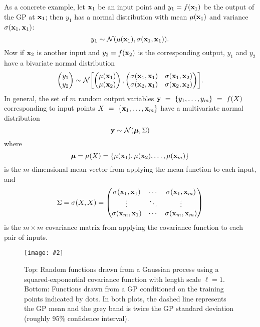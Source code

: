 \documentclass[aps,prc,reprint,superscriptaddress,amsmath]{revtex4-1}
\newcommand{\colfig}[3][t]{
  \begin{figure}[#1]
    \texttt{[image: \#2]}
    \caption{\label{fig:#2}#3}
  \end{figure}
}
\begin{document}
As a concrete example, let $\mathbf x_1$ be an input point and $y_1 = f(\mathbf x_1)$ be the output of the GP at $\mathbf x_1$; then $y_1$ has a normal distribution with mean $\mu(\mathbf x_1)$ and variance $\sigma(\mathbf x_1, \mathbf x_1)$:
\begin{equation}
  y_1 \sim \mathcal N(\mu(\mathbf x_1), \sigma(\mathbf x_1, \mathbf x_1)).
\end{equation}
Now if $\mathbf x_2$ is another input and $y_2 = f(\mathbf x_2)$ is the corresponding output, $y_1$ and $y_2$ have a bivariate normal distribution
\begin{equation}
  \begin{pmatrix}
    y_1 \\ y_2
  \end{pmatrix}
  \sim \mathcal N\biggl[
    \begin{pmatrix}
      \mu(\mathbf x_1) \\ \mu(\mathbf x_2)
    \end{pmatrix},
    \begin{pmatrix}
      \sigma(\mathbf x_1, \mathbf x_1) & \sigma(\mathbf x_1, \mathbf x_2) \\
      \sigma(\mathbf x_2, \mathbf x_1) & \sigma(\mathbf x_2, \mathbf x_2) \\
    \end{pmatrix}
  \biggr].
\end{equation}
In general, the set of $m$ random output variables $\mathbf y~=~\{y_1, \ldots, y_m\}~=~f(X)$ corresponding to input points $X~=~\{\mathbf x_1, \ldots, \mathbf x_m\}$ have a multivariate normal distribution
\begin{equation}
  \mathbf y \sim \mathcal N(\boldsymbol\mu, \Sigma)
\end{equation}
where
\begin{equation}
  \boldsymbol\mu = \mu(X) = \{\mu(\mathbf x_1), \mu(\mathbf x_2), \ldots, \mu(\mathbf x_m)\} \\
\end{equation}
is the $m$-dimensional mean vector from applying the mean function to each input, and
\begin{equation}
  \Sigma = \sigma(X, X) =
  \begin{pmatrix}
    \sigma(\mathbf x_1, \mathbf x_1) & \cdots & \sigma(\mathbf x_1, \mathbf x_m) \\
    \vdots & \ddots & \vdots \\
    \sigma(\mathbf x_m, \mathbf x_1) & \cdots & \sigma(\mathbf x_m, \mathbf x_m) \\
  \end{pmatrix}
\end{equation}
is the $m \times m$ covariance matrix from applying the covariance function to each pair of inputs.

\colfig{gp}{
  Top: Random functions drawn from a Gaussian process using a squared-exponential covariance function with length scale $\ell = 1$.
  Bottom: Functions drawn from a GP conditioned on the training points indicated by dots.
  In both plots, the dashed line represents the GP mean and the grey band is twice the GP standard deviation (roughly 95\% confidence interval).
}
\end{document}
